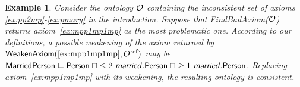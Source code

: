 \documentclass[
]{ceurart}
\newtheorem{example}{Example}
\begin{document}
\begin{example} Consider the ontology $\mathcal{O}$ containing the inconsistent set of axioms \ref{ex:pp2mp}-\ref{ex:pmary} in the introduction.
%
Suppose that \textsf{FindBadAxiom}($\mathcal{O}$) returns axiom~\ref{ex:mpp1mp1mp} as the most problematic one. According to our definitions, a possible weakening of the axiom returned by $\textsf{WeakenAxiom}(\ref{ex:mpp1mp1mp}, O^\text{ref})$ may be $\textsf{MarriedPerson} \sqsubseteq \textsf{Person} \;\sqcap \leq 2~\textsf{\textsl{married}}.\textsf{Person} \;\sqcap \geq 1~\textsf{\textsl{married}}.\textsf{Person}$. Replacing axiom~\ref{ex:mpp1mp1mp} with its weakening, the resulting ontology is consistent.
\end{example}






\end{document}
